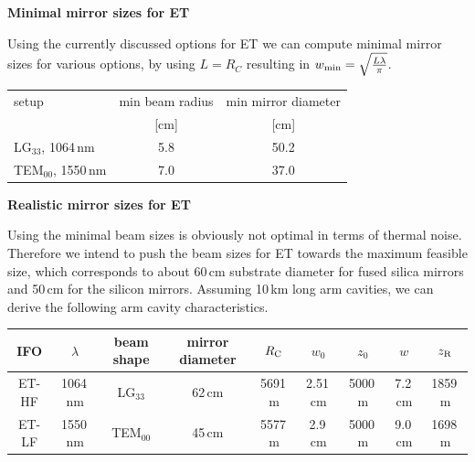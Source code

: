 \textbf{Minimal mirror sizes for ET}

Using the currently discussed options for ET we can compute minimal mirror sizes for various
options, by using $L=R_{C}$ resulting in $w_{\rm min}=\sqrt{\frac{L\lambda}{\pi}}$.
\begin{center}
\begin{tabular}{|l|c|c|}
	\hline
setup & min beam radius  & min mirror diameter \\
         & [cm] & [cm] \\
	\hline
LG$_{33}$, 1064\,nm  &  5.8      &  50.2     \\
	\hline
TEM$_{00}$, 1550\,nm  &  7.0      &   37.0    \\
	\hline
\end{tabular}
\end{center}




\textbf{Realistic mirror sizes for ET}

Using the minimal beam sizes is obviously not optimal in terms of
thermal noise. Therefore we intend to push the beam sizes for ET
towards the maximum feasible size, which corresponds to about 60\,cm
substrate diameter for fused silica mirrors and 50\,cm for the silicon mirrors.
Assuming 10\,km long arm cavities, we can derive the following arm cavity
characteristics.

\begin{center}
\begin{tabular}{|c|c|c|c|c|c|c|c|c|}
  \hline
IFO & $\lambda$& beam shape & mirror diameter & $R_{\rm C}$ & $w_0$ &$z_0$ & $w$ & $z_{\rm R}$ \\
\hline
ET-HF & 1064\,nm & LG$_{33}$ & 62\,cm & 5691\,m & 2.51\,cm & 5000\,m & 7.2\,cm & 1859\,m\\
\hline
ET-LF & 1550\,nm & TEM$_{00}$ & 45\,cm &5577\,m & 2.9\,cm & 5000\,m & 9.0\,cm & 1698\,m\\
\hline
\end{tabular}
\end{center}


